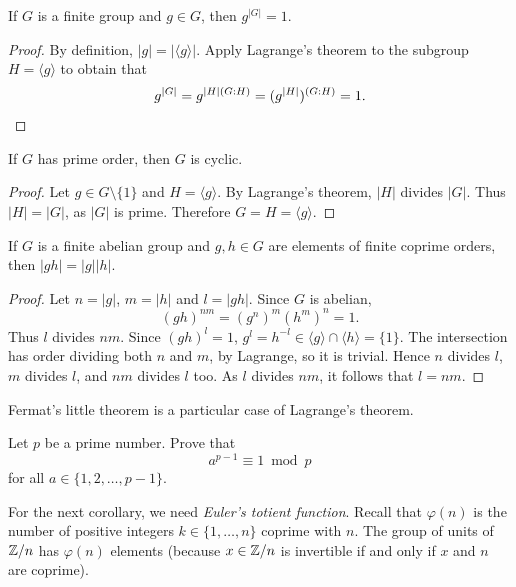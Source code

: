 \begin{corollary}
    If $G$ is a finite group and $g\in G$, then $g^{|G|}=1$.
\end{corollary}

\begin{proof}
    By definition, $|g|=|\langle g\rangle|$. Apply Lagrange's theorem 
    to the subgroup $H=\langle g\rangle$ to obtain that 
    \[
            g^{|G|}=g^{|H|(G:H)}=(g^{|H|})^{(G:H)}=1.\qedhere
    \]
\end{proof}

\begin{corollary}
    If $G$ has prime order, then $G$ is cyclic. 
\end{corollary}

\begin{proof}
    Let $g\in G\setminus\{1\}$ and $H=\langle g\rangle$. By Lagrange's theorem, 
    $|H|$ divides $|G|$. Thus $|H|=|G|$, as $|G|$ is prime. Therefore 
    $G=H=\langle g\rangle$.
\end{proof}

\begin{corollary}
\label{cor:coprime_orders}
    If $G$ is a finite abelian group and $g,h\in G$ are elements of finite coprime orders, 
    then 
    $|gh|=|g||h|$.
\end{corollary}

\begin{proof}
    Let $n=|g|$, $m=|h|$ and $l=|gh|$. Since $G$ is abelian,
    \[
    (gh)^{nm}=(g^n)^m(h^m)^n=1. 
    \]
    Thus $l$ divides $nm$. Since $(gh)^l=1$,
    $g^l=h^{-l}\in \langle g\rangle\cap\langle h\rangle=\{1\}$. The intersection
    has order dividing both $n$ and $m$, by Lagrange, so it is trivial. 
    Hence $n$ divides $l$, $m$ divides $l$, and $nm$ divides $l$ too. As 
    $l$ divides $nm$, it follows that $l=nm$. 
\end{proof}

Fermat's little theorem is a particular case of Lagrange's theorem. 

\begin{exercise}
    Let $p$ be a prime number. Prove that 
    \[a^{p-1}\equiv1\bmod p
    \]
    for all $a\in\{1,2,\dots,p-1\}$.
\end{exercise}

For the next corollary, we need \emph{Euler's totient function}. 
Recall that 
$\varphi(n)$ is the number of positive integers $k\in\{1,\dots,n\}$
coprime with $n$. The group of units of 
$\mathbb{Z}/n$ has $\varphi(n)$ elements (because $x\in\mathbb{Z}/n$ is invertible
if and only if $x$ and $n$ are coprime).

